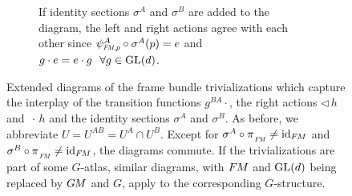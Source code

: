 \begin{figure}
\begin{subfigure}[b]{0.47\textwidth}
        \vspace*{8ex}
        \caption{\small
            If identity sections $\sigma^A$ and $\sigma^B$ are added to the diagram, the left and right actions agree with each other
            since $\psiFMp^A\circ\sigma^A(p)=e$ and $g\cdot e=e\cdot g\ \ \forall g\in \operatorname{GL}(d)$.
        }
        \label{fig:trivialization_FM_section}
    \end{subfigure}
    \caption{\small
        Extended diagrams of the frame bundle trivializations which capture the interplay of the transition functions $g^{BA}\cdot$, the right actions $\lhd\,h$ and $\,\cdot\,h$ and the identity sections $\sigma^A$ and $\sigma^B$.
        As before, we abbreviate $U=U^{AB}=U^A\cap U^B$.
        Except for $\sigma^A\circ\piFM \neq \id_{\FM}$ and $\sigma^B\circ\piFM \neq \id_{\FM}$, the diagrams commute.
        If the trivializations are part of some $G$-atlas, similar diagrams, with $F\mkern-1.5muM$ and $\operatorname{GL}(d)$ being replaced by $G\mkern-1.4muM$ and $G$, apply to the corresponding $G$-structure.
    }
    \label{fig:trivializations_FM_complete}
\end{figure}


